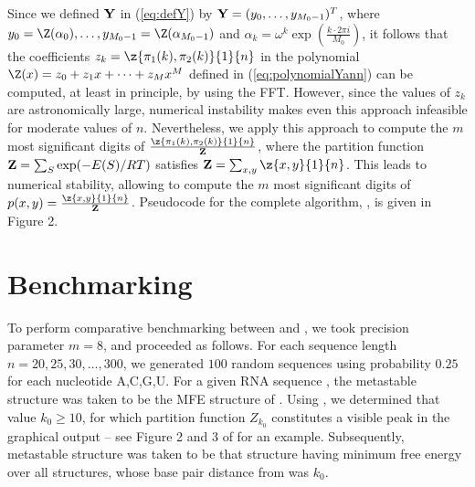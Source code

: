 Since we defined $\bf Y$ in (\ref{eq:defY}) by ${\bf Y} =
(y_0,\ldots,y_{M_0-1})^T$, where
$y_0=\Z(\alpha_0),\ldots, y_{M_0-1}=\Z(\alpha_{M_0-1})$ and $\alpha_k = \omega^k
\exp(\frac{k \cdot 2\pi i}{M_0})$,
it follows that the coefficients
$z_k=\z{\pi_1(k),\pi_2(k)}{1}{n}$ in the polynomial
$\Z(x) = z_0 + z_1 x + \cdots + z_{M} x^{M}$ defined in
(\ref{eq:polynomialYann}) can be computed, at least in principle,
by using the FFT. However, since the values of
$z_{k}$ are astronomically large, numerical
instability makes even this approach infeasible for moderate values of $n$.
Nevertheless, we apply this approach to compute the $m$ most significant
digits of $\frac{\z{\pi_1(k),\pi_2(k)}{1}{n}}{{\bf Z}}$,
where the partition function ${\bf Z} = \sum_{S} \exp(-E(S)/RT)$ satisfies
${{\bf Z}} = \sum_{x,y} \z{x,y}{1}{n}$. This leads to numerical stability,
allowing \ffttwo to compute the
$m$ most significant digits of $p(x,y) = \frac{\z{x,y}{1}{n}}{{\bf Z}}$.
Pseudocode for the complete algorithm, \fftbor, is given in
Figure 2.


\section{Benchmarking}
\label{section:benchmarking}

To perform comparative benchmarking between \rnatwofold and \ffttwo,
we took precision parameter $m=8$, and proceeded as follows.
For each sequence length $n = 20,25,30,\ldots,300$, we generated
$100$ random sequences using probability $0.25$ for each nucleotide A,C,G,U.
For a given RNA sequence \seq, the metastable structure \strA was
taken to be the MFE structure of \seq.
Using \rnabor, we determined that value $k_0\geq 10$, for which
partition function $Z_{k_0}$ constitutes a visible peak in the graphical
output -- see Figure 2 and 3 of  \citep{Freyhult.b07} for an example.
Subsequently, metastable structure \strB was taken to be that structure
having minimum free energy over all structures, whose base pair distance from
\strA was $k_0$.

